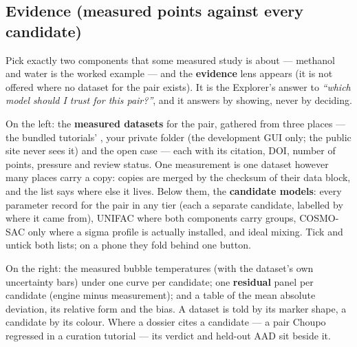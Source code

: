 \documentclass[11pt,a4paper]{article}
\begin{document}
\subsection{Evidence (measured points against every candidate)}\label{sec:explorer-evidence}
Pick exactly two components that some measured study is about --- methanol
and water is the worked example --- and the \textbf{evidence} lens appears
(it is not offered where no dataset for the pair exists).  It is the
Explorer's answer to \emph{``which model should I trust for this pair?''},
and it answers by showing, never by deciding.

On the left: the \textbf{measured datasets} for the pair, gathered from
three places --- the bundled tutorials' , your
private  folder (the development GUI only; the
public site never sees it) and the open case --- each with its citation,
DOI, number of points, pressure and review status.  One measurement is one
dataset however many places carry a copy: copies are merged by the checksum
of their data block, and the list says where else it lives.  Below them, the
\textbf{candidate models}: every parameter record for the pair in any tier
(each a separate candidate, labelled by where it came from), UNIFAC where
both components carry groups, COSMO-SAC only where a sigma profile is
actually installed, and ideal mixing.  Tick and untick both lists; on a
phone they fold behind one button.

On the right: the measured bubble temperatures (with the dataset's own
uncertainty bars) under one curve per candidate; one \textbf{residual} panel
per candidate (engine minus measurement); and a table of the mean absolute
deviation, its relative form and the bias.  A dataset is told by its marker
shape, a candidate by its colour.  Where a dossier cites a candidate --- a
pair Choupo regressed in a curation tutorial --- its verdict and held-out
AAD sit beside it.
\end{document}
